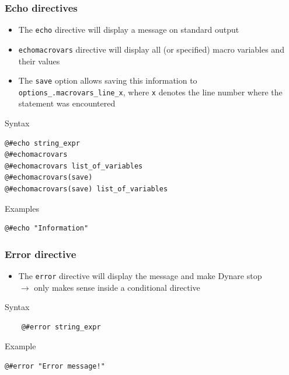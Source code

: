 \documentclass[handout,usepdftitle=false,xcolor=dvipsnames,aspectratio=169]{beamer}
\begin{document}
\begin{frame}[fragile]
  \frametitle{Echo directives}

  \begin{itemize}
    \item The \texttt{echo} directive will display a message on standard output
    \item \texttt{echomacrovars} directive will display all (or specified) macro variables and their values
    \item The \texttt{save} option allows saving this information to \texttt{options\_.macrovars\_line\_x}, where \texttt{x} denotes the line number where the statement was encountered
  \end{itemize}

  \begin{block}{Syntax}
    \small
    \begin{verbatim}
@#echo string_expr
@#echomacrovars
@#echomacrovars list_of_variables
@#echomacrovars(save)
@#echomacrovars(save) list_of_variables
  \end{verbatim}
  \end{block}
  \begin{block}{Examples}
    \begin{verbatim}
@#echo "Information"
\end{verbatim}
  \end{block}
\end{frame}

\begin{frame}[fragile]
  \frametitle{Error directive}

  \begin{itemize}
    \item The \texttt{error} directive will display the message and make Dynare stop\\
          $\rightarrow$ only makes sense inside a conditional directive
  \end{itemize}

  \begin{block}{Syntax}
    \begin{verbatim}
    @#error string_expr
    \end{verbatim}
  \end{block}

  \begin{block}{Example}
    \begin{verbatim}
@#error "Error message!"
\end{verbatim}
  \end{block}
\end{frame}
\end{document}
